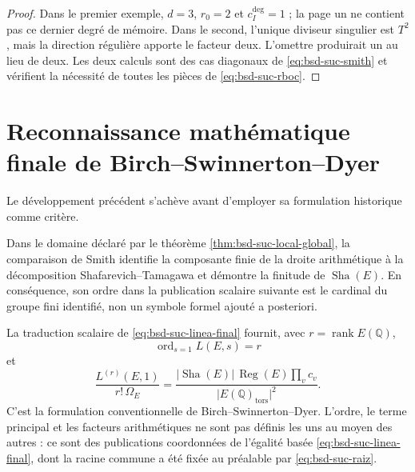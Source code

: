 \begin{proof}
Dans le premier exemple, \(d=3\), \(r_0=2\) et
\(c_I^{\deg}=1\) ; la page un ne contient pas ce dernier degré de mémoire. Dans
le second, l'unique diviseur singulier est \(T^2\), mais la direction régulière
apporte le facteur deux. L'omettre produirait un au lieu de deux. Les deux calculs
sont des cas diagonaux de \eqref{eq:bsd-suc-smith} et vérifient la nécessité de
toutes les pièces de \eqref{eq:bsd-suc-rboc}.
\end{proof}
\section*{Reconnaissance mathématique finale de Birch--Swinnerton--Dyer}

Le développement précédent s'achève avant d'employer sa formulation historique
comme critère.

Dans le domaine déclaré par le théorème
\ref{thm:bsd-suc-local-global}, la comparaison de Smith identifie la
composante finie de la droite arithmétique à la décomposition
Shafarevich--Tamagawa et démontre la finitude de
\(\operatorname{Sha}(E)\). En conséquence, son ordre dans la publication
scalaire suivante est le cardinal du groupe fini identifié, non un symbole
formel ajouté a posteriori.

La traduction scalaire de \eqref{eq:bsd-suc-linea-final} fournit, avec
\(r=\operatorname{rank}E(\mathbb Q)\),
\begin{equation}\label{eq:bsd-suc-rango-final}
 \operatorname{ord}_{s=1}L(E,s)=r
\end{equation}
et
\begin{equation}\label{eq:bsd-suc-formula-final}
 \frac{L^{(r)}(E,1)}{r!\,\Omega_E}
 =\frac{
   \lvert\operatorname{Sha}(E)\rvert\,\operatorname{Reg}(E)\prod_v c_v}
  {\lvert E(\mathbb Q)_{\mathrm{tors}}\rvert^2}.
\end{equation}
C'est la formulation conventionnelle de Birch--Swinnerton--Dyer. L'ordre,
le terme principal et les facteurs arithmétiques ne sont pas définis les uns au moyen des
autres : ce sont des publications coordonnées de l'égalité basée
\eqref{eq:bsd-suc-linea-final}, dont la racine commune a été fixée au préalable par
\eqref{eq:bsd-suc-raiz}.
